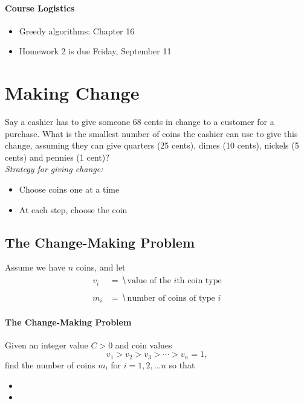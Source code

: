 \documentclass[11  pt]{article}
\begin{document}
	
	
	
	\paragraph{Course Logistics}
	
	\begin{itemize}
		\item Greedy algorithms: Chapter 16
		\item Homework 2 is due Friday, September 11
	\end{itemize}
	

	\section{Making Change}
	Say a cashier has to give someone 68 cents in change to a customer for a purchase. What is the smallest number of coins the cashier can use to give this change, assuming they can give quarters (25 cents), dimes (10 cents), nickels (5 cents) and pennies (1 cent)?\\
	
	\textit{Strategy for giving change:} 
	\begin{itemize}
		\item Choose coins one at a time
		\item At each step, choose the coin  %
	\end{itemize}


	
	\newpage
	\subsection{The Change-Making Problem}
	
	Assume we have $n$ coins, and let
	\begin{align*}
		v_i &=  \hide{ \text{value of the $i$th coin type}} \\ \\
		m_i  &= \hide{\text{number of coins of type $i$}}
	\end{align*}
	
	\paragraph{The Change-Making Problem} Given an integer value $C > 0$ and coin values $$v_1 > v_2 > v_3 > \cdots > v_n = 1,$$ find the number of coins $m_i$ for $i = 1, 2, \hdots n$ so that 
	\begin{itemize}
		\itemsep = 4em
		\item  %
		\item %
	\end{itemize}
	
\end{document}
